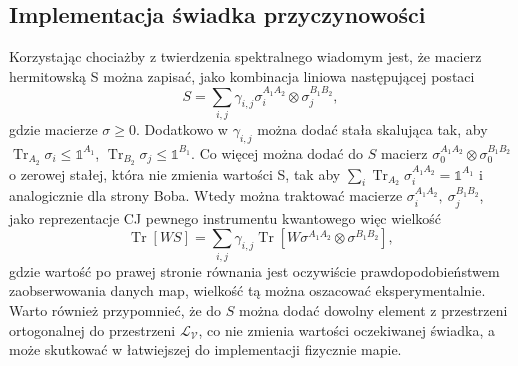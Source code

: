 \documentclass[10pt]{article} %
\DeclareMathOperator{\Trs}{Tr}
\newcommand{\I}{\mathbb{1}}
\begin{document}
\subsection{Implementacja świadka przyczynowości}
Korzystając chociażby z twierdzenia spektralnego wiadomym jest, że macierz hermitowską S można zapisać, jako kombinacja liniowa następującej postaci
\begin{equation}
S = \sum_{i,j} \gamma_{i,j} \sigma^{A_1A_2}_i \otimes \sigma^{B_1B_2}_j,
\end{equation} gdzie macierze $\sigma \geq 0$. Dodatkowo w $\gamma_{i,j}$ można dodać stała skalująca tak, aby $\Trs_{A_2} \sigma_i \leq \I^{A_1}$, $\Trs_{B_2} \sigma_j \leq \I^{B_1}$.
Co więcej można dodać do $S$ macierz $\sigma_0^{A_1A_2} \otimes \sigma_0^{B_1B_2}$ o zerowej stałej, która nie zmienia wartości S, tak aby $\sum_i \Trs_{A_2} \sigma^{A_1A_2}_i = \I^{A_1}$ i analogicznie dla strony Boba. Wtedy można traktować macierze $\sigma^{A_1A_2}_i,~ \sigma^{B_1B_2}_j$, jako reprezentacje CJ pewnego instrumentu kwantowego więc wielkość
\begin{equation}
\Trs \left[ W S \right] = \sum_{i,j} \gamma_{i,j} \Trs\left[ W \sigma^{A_1A_2} \otimes \sigma^{B_1B_2} \right],
\end{equation} gdzie wartość po prawej stronie równania jest oczywiście prawdopodobieństwem zaobserwowania danych map, wielkość tą można oszacować eksperymentalnie.
Warto również przypomnieć, że do $S$ można dodać dowolny element z przestrzeni ortogonalnej do przestrzeni $\mathcal{L_V}$, co nie zmienia wartości oczekiwanej świadka, a może skutkować w łatwiejszej do implementacji fizycznie mapie. 
\end{document}
